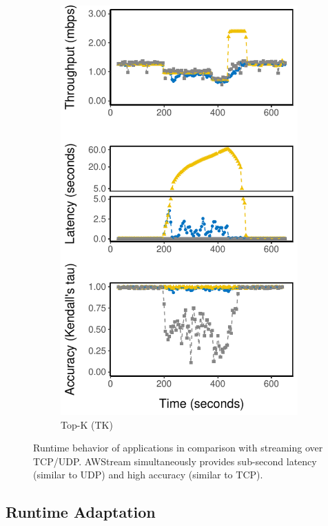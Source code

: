 \begin{figure}
\begin{subfigure}{0.3\textwidth}
    \includegraphics[width=\textwidth]{figures/runtime-topk-verticle.pdf}
    \caption{Top-K (TK)}
    \label{fig:tk-runtime}
  \end{subfigure}
  \caption{Runtime behavior of \sysname{} applications in comparison with streaming over TCP/UDP\@. AWStream simultaneously provides sub-second latency (similar to UDP) and high accuracy (similar to TCP).}
  \label{fig:all-runtime}
\end{figure}

\newpage

\subsection{Runtime Adaptation}
\label{sec:runtime-adaptation}

